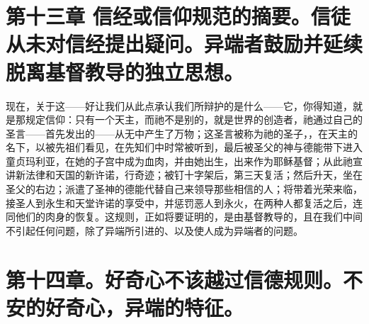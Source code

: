 
\section{第十三章 信经或信仰规范的摘要。信徒从未对信经提出疑问。异端者鼓励并延续脱离基督教导的独立思想。}

现在，关于这——好让我们从此点承认我们所辩护的是什么——它，你得知道，就是那规定信仰：只有一个天主，而祂不是别的，就是世界的创造者，祂通过自己的圣言——首先发出的——从无中产生了万物；这圣言被称为祂的圣子，，在天主的名下，以被先祖们看见，在先知们中时常被听到，最后被圣父的神与德能带下进入童贞玛利亚，在她的子宫中成为血肉，并由她出生，出来作为耶稣基督；从此祂宣讲新法律和天国的新许诺，行奇迹；被钉十字架后，第三天复活；然后升天，坐在圣父的右边；派遣了圣神的德能代替自己来领导那些相信的人；将带着光荣来临，接圣人到永生和天堂许诺的享受中，并惩罚恶人到永火，在两种人都复活之后，连同他们的肉身的恢复。这规则，正如将要证明的，是由基督教导的，且在我们中间不引起任何问题，除了异端所引进的、以及使人成为异端者的问题。\par


\section{第十四章。好奇心不该越过信德规则。不安的好奇心，异端的特征。}

